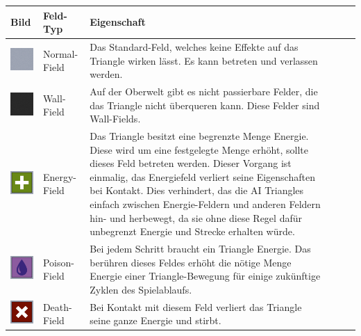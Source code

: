\begin{center}
\label{tbl_fields}
\begin{tabular}{ | p{1.5cm} |p{3cm} | p{8.5cm}| c r r }
\hline
Bild & Feld-Typ & Eigenschaft \\
\hline
\includegraphics[scale=0.6]{bilder/Style-Classic_Normal_Field.png} & Normal-Field & Das Standard-Feld, welches keine Effekte auf das Triangle wirken lässt. Es kann betreten und verlassen werden. \\ 
\hline
\includegraphics[scale=0.6]{bilder/Style-Classic_Wall_Field.png} & Wall-Field & Auf der Oberwelt gibt es nicht passierbare Felder, die das Triangle nicht überqueren kann. Diese Felder sind Wall-Fields. \\ 
\hline
\includegraphics[scale=0.6]{bilder/Style-Classic_Energy_Field.png} & Energy-Field & Das Triangle besitzt eine begrenzte Menge Energie. Diese wird um eine festgelegte Menge erhöht, sollte dieses Feld betreten werden. Dieser Vorgang ist einmalig, das Energiefeld verliert seine Eigenschaften bei Kontakt. Dies verhindert, das die AI Triangles einfach zwischen Energie-Feldern und anderen Feldern hin- und herbewegt, da sie ohne diese Regel dafür unbegrenzt Energie und Strecke erhalten würde.\\
\hline
\includegraphics[scale=0.6]{bilder/Style-Classic_Poison_Field.png} & Poison-Field & Bei jedem Schritt braucht ein Triangle Energie. Das berühren dieses Feldes erhöht die nötige Menge Energie einer Triangle-Bewegung für einige zukünftige Zyklen des Spielablaufs. \\ 
\hline
\includegraphics[scale=0.6]{bilder/Style-Classic_Death_Field.png} & Death-Field & Bei Kontakt mit diesem Feld verliert das Triangle seine ganze Energie und stirbt. \\ 
\hline
\end{tabular}
\end{center}

